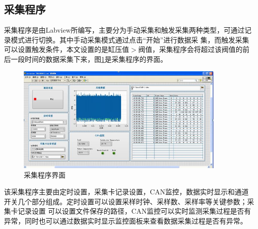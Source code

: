 \subsection{采集程序}
采集程序是由Labview所编写，主要分为手动采集和触发采集两种类型，可通过记录模式进行切换。其中手动采集模式通过点击“开始”进行数据采
集，而触发采集可以设置触发条件，本文设置的是缸压值$>$阀值，采集程序会将超过该阀值的前后一段时间的数据采集下来，图\ref{fig:cjcxjm}是采集程序的界面。
\begin{figure}[!ht]
	\centering
	\includegraphics[width=0.9\textwidth]{thesis_figure/platformer_chapter/cjcxjm}
	\caption{采集程序界面}
	\label{fig:cjcxjm}
\end{figure}
\par 该采集程序主要由定时设置，采集卡记录设置，CAN监控，数据实时显示和通道开关几个部分组成。定时设置可以设置采样时钟、采样数、采样率等关键参数；采集卡记录设置
可以设置文件保存的路径，CAN监控可以实时监测采集过程是否有异常，同时也可以通过数据实时显示监控面板来查看数据采集过程是否有异常。





